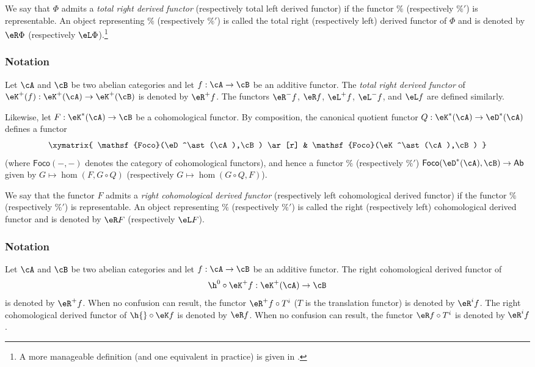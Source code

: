 \documentclass[oneside]{book}
\begin{document}
\begin{definition}\label{VIII:4-1-2}
We say that $\Phi$ admits a \emph{total right derived functor}
(respectively total left derived functor) if the functor $\%$
(respectively $\%'$) is representable. An object representing $\%$
(respectively $\%'$) is called the total right (respectively left) derived
functor of $\Phi$ and is denoted by $\eR \Phi$ (respectively
$\eL \Phi$).\footnote{A more manageable definition (and one equivalent in
practice) is given in \cite[XVII 1.2]{sga4}.}
\end{definition}

\subsubsection{Notation}\label{VIII:4-1-3}

Let $\cA$ and $\cB$ be two abelian categories and let $f:\cA\to \cB$ be
an additive functor. The \emph{total right derived functor} of
$\eK^+(f):\eK^+(\cA) \to \eK^+(\cB)$ is denoted by $\eR^+ f$. The
functors $\eR^- f$, $\eR f$, $\eL^+ f$, $\eL^- f$, and $\eL f$ are
defined similarly.

Likewise, let $F:\eK^\ast(\cA) \to \cB$ be a cohomological functor.
By composition, the canonical quotient functor
$Q:\eK^\ast(\cA) \to \eD^\ast(\cA)$ defines a functor
\[\xymatrix{
  \mathsf{Foco}(\eD^\ast(\cA),\cB) \ar[r]
    & \mathsf{Foco}(\eK^\ast(\cA),\cB)
}\]
(where $\mathsf{Foco}(-,-)$ denotes the category of cohomological
functors), and hence a functor $\%$ (respectively $\%'$)
$\mathsf{Foco}(\eD^\ast(\cA),\cB) \to \mathsf{Ab}$ given by
$G\mapsto \hom(F,G\circ Q)$ (respectively
$G\mapsto \hom(G\circ Q,F)$).

\begin{definition}\label{VIII:4-1-4}
We say that the functor $F$ admits a \emph{right cohomological derived
functor} (respectively left cohomological derived functor) if the functor
$\%$ (respectively $\%'$) is representable. An object representing $\%$
(respectively $\%'$) is called the right (respectively left)
cohomological derived functor and is denoted by $\eR F$ (respectively
$\eL F$).
\end{definition}

\subsubsection{Notation}\label{VIII:4-1-5}

Let $\cA$ and $\cB$ be two abelian categories and let $f:\cA\to \cB$ be
an additive functor. The right cohomological derived functor of
\[
  \h^0{}\circ \eK^+ f:\eK^+(\cA) \to \cB
\]
is denoted by $\eR^+ f$. When no confusion can result, the functor
$\eR^+ f\circ T^i$ ($T$ is the translation functor) is denoted by
$\eR^i f$. The right cohomological derived functor of
$\h{}\circ \eK f$ is denoted by $\eR f$. When no confusion can result,
the functor $\eR f\circ T^i$ is denoted by $\eR^i f$.
\end{document}
